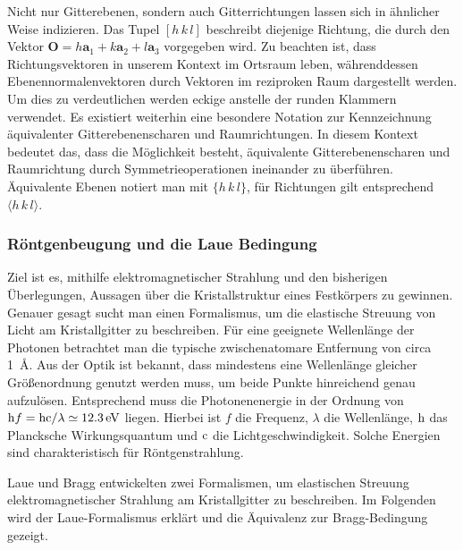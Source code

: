 Nicht nur Gitterebenen, sondern auch Gitterrichtungen lassen sich in ähnlicher Weise indizieren.
Das Tupel $[h\,k\,l]$ beschreibt diejenige Richtung, die durch den Vektor $\mathbf{O} = h\mathbf{a}_{1}+k\mathbf{a}_{2}+
l\mathbf{a}_{3}$ vorgegeben wird.
Zu beachten ist, dass Richtungsvektoren in unserem Kontext im Ortsraum leben,
währenddessen Ebenennormalenvektoren durch Vektoren im reziproken Raum dargestellt werden.
Um dies zu verdeutlichen werden eckige anstelle der runden Klammern verwendet.
Es existiert weiterhin eine besondere Notation zur Kennzeichnung äquivalenter Gitterebenenscharen und Raumrichtungen.
In diesem Kontext bedeutet das, dass die Möglichkeit besteht, äquivalente Gitterebenenscharen und Raumrichtung durch
Symmetrieoperationen ineinander zu überführen.
Äquivalente Ebenen notiert man mit $\{h \,k\, l \}$, für Richtungen gilt entsprechend $\langle h\, k \, l \rangle$.
\autocite[116]{Ashcroft}

\subsubsection{Röntgenbeugung und die Laue Bedingung}
Ziel ist es, mithilfe elektromagnetischer Strahlung und den bisherigen Überlegungen, Aussagen über die
Kristallstruktur eines Festkörpers zu gewinnen.
Genauer gesagt sucht man einen Formalismus, um die elastische Streuung von Licht am Kristallgitter zu beschreiben.
Für eine geeignete Wellenlänge der Photonen betrachtet man die typische zwischenatomare Entfernung von circa
\qty{1}{\angstrom}.
Aus der Optik ist bekannt, dass mindestens eine Wellenlänge gleicher Größenordnung genutzt werden
muss, um beide Punkte hinreichend genau aufzulösen.
Entsprechend muss die Photonenenergie in der Ordnung von
$\mathrm{h} f =\mathrm{h} \mathrm{c} / \lambda \simeq \qty{12.3}{\electronvolt}$ liegen.
Hierbei ist $f$ die Frequenz, $\lambda$ die Wellenlänge, $\mathrm{h}$ das Plancksche Wirkungsquantum und $\mathrm{c}$ die
Lichtgeschwindigkeit.
Solche Energien sind charakteristisch für Röntgenstrahlung. \autocite[120]{Ashcroft}

Laue und Bragg entwickelten zwei Formalismen, um elastischen Streuung elektromagnetischer Strahlung am Kristallgitter
zu beschreiben.
Im Folgenden wird der Laue-Formalismus erklärt und die Äquivalenz zur Bragg-Bedingung gezeigt.

